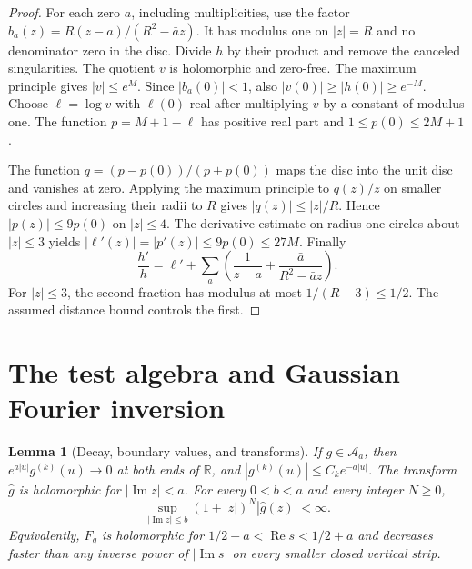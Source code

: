 \documentclass[11pt]{article}
\newtheorem{lemma}[theorem]{Lemma}
\theoremstyle{definition}
\theoremstyle{remark}
\numberwithin{equation}{section}
\newcommand{\R}{\mathbb R}
\newcommand{\A}{\mathcal A}
\begin{document}
\begin{proof}
For each zero $a$, including multiplicities, use the factor
$b_a(z)=R(z-a)/(R^2-\bar a z)$.
It has modulus one on $|z|=R$ and no denominator zero in the disc.
Divide $h$ by their product and remove the canceled singularities.
The quotient $v$ is holomorphic and zero-free.
The maximum principle gives $|v|\leq e^M$.
Since $|b_a(0)|<1$, also $|v(0)|\geq|h(0)|\geq e^{-M}$.
Choose $\ell=\log v$ with $\ell(0)$ real after multiplying $v$ by a constant
of modulus one.  The function $p=M+1-\ell$ has positive real part and
$1\leq p(0)\leq2M+1$.

The function $q=(p-p(0))/(p+p(0))$ maps the disc into the unit disc and
vanishes at zero.  Applying the maximum principle to $q(z)/z$ on smaller
circles and increasing their radii to $R$ gives $|q(z)|\leq|z|/R$.
Hence $|p(z)|\leq9p(0)$ on $|z|\leq4$.
The derivative estimate on radius-one circles about $|z|\leq3$ yields
$|\ell'(z)|=|p'(z)|\leq9p(0)\leq27M$.
Finally
\[
 \frac{h'}h=\ell'+\sum_a
 \left(\frac1{z-a}+\frac{\bar a}{R^2-\bar a z}\right).
\]
For $|z|\leq3$, the second fraction has modulus at most $1/(R-3)\leq1/2$.
The assumed distance bound controls the first.
\end{proof}

\section{The test algebra and Gaussian Fourier inversion}
\label{sec:tests}

\begin{lemma}[Decay, boundary values, and transforms]
\label{lem:test-bounds}
If $g\in\A_a$, then $e^{a|u|}g^{(k)}(u)\to0$ at both ends of $\R$,
and $|g^{(k)}(u)|\leq C_k e^{-a|u|}$.
The transform $\widehat g$ is holomorphic for $|\operatorname{Im}z|<a$.
For every $0<b<a$ and every integer $N\geq0$,
\begin{equation}
 \sup_{|\operatorname{Im}z|\leq b}(1+|z|)^N|\widehat g(z)|<\infty.
 \label{eq:strip-decay}
\end{equation}
Equivalently, $F_g$ is holomorphic for $1/2-a<\operatorname{Re}s<1/2+a$
and decreases faster than any inverse power of $|\operatorname{Im}s|$
on every smaller closed vertical strip.
\end{lemma}
\end{document}
